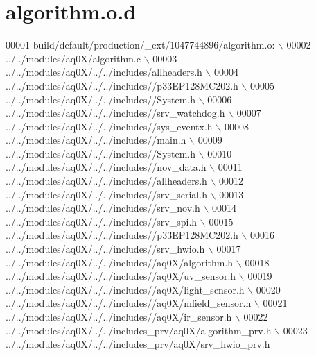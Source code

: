\hypertarget{a00039_source}{\section{algorithm.\+o.\+d}
\label{a00039_source}
}

\begin{DoxyCode}
00001 build/\textcolor{keywordflow}{default}/production/\_ext/1047744896/algorithm.o:  \(\backslash\)
00002  ../../modules/aq0X/algorithm.c  \(\backslash\)
00003 ../../modules/aq0X/../../includes/allheaders.h  \(\backslash\)
00004 ../../modules/aq0X/../../includes\textcolor{comment}{//p33EP128MC202.h  \(\backslash\)}
00005 \textcolor{comment}{../../modules/aq0X/../../includes//System.h  \(\backslash\)}
00006 \textcolor{comment}{../../modules/aq0X/../../includes//srv\_watchdog.h  \(\backslash\)}
00007 \textcolor{comment}{../../modules/aq0X/../../includes//sys\_eventx.h  \(\backslash\)}
00008 \textcolor{comment}{../../modules/aq0X/../../includes//main.h  \(\backslash\)}
00009 \textcolor{comment}{../../modules/aq0X/../../includes//System.h  \(\backslash\)}
00010 \textcolor{comment}{../../modules/aq0X/../../includes//nov\_data.h  \(\backslash\)}
00011 \textcolor{comment}{../../modules/aq0X/../../includes//allheaders.h  \(\backslash\)}
00012 \textcolor{comment}{../../modules/aq0X/../../includes//srv\_serial.h  \(\backslash\)}
00013 \textcolor{comment}{../../modules/aq0X/../../includes//srv\_nov.h  \(\backslash\)}
00014 \textcolor{comment}{../../modules/aq0X/../../includes//srv\_spi.h  \(\backslash\)}
00015 \textcolor{comment}{../../modules/aq0X/../../includes//p33EP128MC202.h  \(\backslash\)}
00016 \textcolor{comment}{../../modules/aq0X/../../includes//srv\_hwio.h  \(\backslash\)}
00017 \textcolor{comment}{../../modules/aq0X/../../includes//aq0X/algorithm.h  \(\backslash\)}
00018 \textcolor{comment}{../../modules/aq0X/../../includes//aq0X/uv\_sensor.h  \(\backslash\)}
00019 \textcolor{comment}{../../modules/aq0X/../../includes//aq0X/light\_sensor.h  \(\backslash\)}
00020 \textcolor{comment}{../../modules/aq0X/../../includes//aq0X/mfield\_sensor.h  \(\backslash\)}
00021 \textcolor{comment}{../../modules/aq0X/../../includes//aq0X/ir\_sensor.h  \(\backslash\)}
00022 \textcolor{comment}{../../modules/aq0X/../../includes\_prv/aq0X/algorithm\_prv.h  \(\backslash\)}
00023 \textcolor{comment}{../../modules/aq0X/../../includes\_prv/aq0X/srv\_hwio\_prv.h }
\end{DoxyCode}

